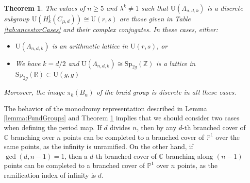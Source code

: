 \documentclass[12pt, letterpaper]{amsart}
\theoremstyle{plain}
\newtheorem{theorem}{Theorem}[section]
\theoremstyle{definition}
\begin{document}
\begin{theorem}
\cite[Theorem 7.1]{McM13}
\label{thm:Mcmullen}
The values of $n \geq 5$ 
and $\lambda^k \neq 1$ such that $\mathrm{U}(\Lambda_{n,d,k})$ is a discrete subgroup 
$\mathrm{U}\left(H^1_k(C_{\mu,d}) \right) \cong \mathrm{U}(r,s)$ are those given in Table \ref{tab:ancestorCases} and their complex conjugates. In these cases, either:
\begin{itemize}
    \item $\mathrm{U}(\Lambda_{n,d,k})$ is an arithmetic lattice in $\mathrm{U}(r,s)$, or
    \item We have $k=d/2$ and $\mathrm{U}(\Lambda_{n,d,k}) \cong \mathrm{Sp}_{2g}(\mathbb{Z})$ is a lattice in $\mathrm{Sp}_{2g}(\mathbb{R}) \subset \mathrm{U}(g,g)$ 
\end{itemize}
Moreover, the image $\pi_k(B_n)$ of the braid group  is discrete in all these cases. 
\end{theorem}
The behavior of the monodromy representation described in 
Lemma \ref{lemma:FundGroups} and Theorem \ref{thm:Mcmullen}
implies that we should consider two cases when defining the period map. If $d$ divides $n$, then by any $d$-th branched cover of $\mathbb{C}$ branching over $n$ points can be completed to a branched cover of $\mathbb{P}^1$ over the same points, as the infinity is unramified. On the other hand, if $\gcd(d,n-1)=1$, then a $d$-th branched cover of $\mathbb{C}$ branching along $(n-1)$ points can be completed to a branched cover of $\mathbb{P}^1$ over $n$ points, as the ramification index of infinity is $d$.  

\end{document}
